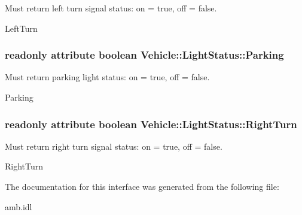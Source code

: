 Must return left turn signal status\-: on = true, off = false. 

Left\-Turn \hypertarget{interfaceVehicle_1_1LightStatus_ac5a9edd74677a136360befca0dcff739}{
\subsubsection[{Parking}]{\setlength{\rightskip}{0pt plus 5cm}readonly attribute boolean Vehicle\-::\-Light\-Status\-::\-Parking}}\label{interfaceVehicle_1_1LightStatus_ac5a9edd74677a136360befca0dcff739}


Must return parking light status\-: on = true, off = false. 

Parking \hypertarget{interfaceVehicle_1_1LightStatus_a8d77780fdf8807d228aa8777e27fcc0a}{
\subsubsection[{Right\-Turn}]{\setlength{\rightskip}{0pt plus 5cm}readonly attribute boolean Vehicle\-::\-Light\-Status\-::\-Right\-Turn}}\label{interfaceVehicle_1_1LightStatus_a8d77780fdf8807d228aa8777e27fcc0a}


Must return right turn signal status\-: on = true, off = false. 

Right\-Turn 

The documentation for this interface was generated from the following file\-:\begin{DoxyCompactItemize}
\item 
amb.\-idl\end{DoxyCompactItemize}
